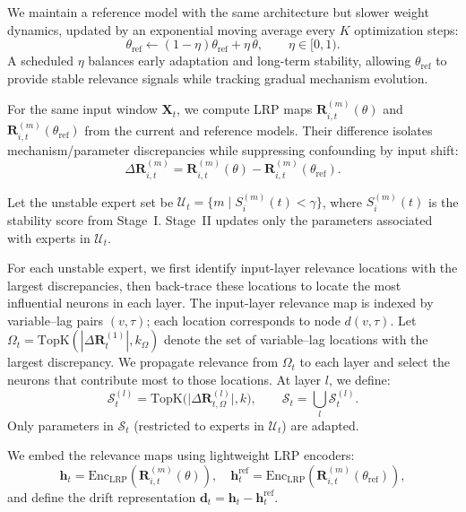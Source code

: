 ﻿\documentclass[journal]{IEEEtran}
\newenvironment{auditproblemblock}{\begingroup\color{red}}{\endgroup}
\begin{document}
\begin{auditproblemblock}
We maintain a reference model with the same architecture but slower weight dynamics, updated by an exponential moving average every $K$ optimization steps:
\begin{equation}
\theta_{\mathrm{ref}} \leftarrow (1-\eta)\theta_{\mathrm{ref}} + \eta\,\theta,\qquad \eta\in[0,1).
\end{equation}
A scheduled $\eta$ balances early adaptation and long-term stability, allowing $\theta_{\mathrm{ref}}$ to provide stable relevance signals while tracking gradual mechanism evolution.

For the same input window $\mathbf{X}_t$, we compute LRP maps $\mathbf{R}_{i,t}^{(m)}(\theta)$ and $\mathbf{R}_{i,t}^{(m)}(\theta_{\mathrm{ref}})$ from the current and reference models. Their difference isolates mechanism/parameter discrepancies while suppressing confounding by input shift:
\begin{equation}
\Delta \mathbf{R}_{i,t}^{(m)} = \mathbf{R}_{i,t}^{(m)}(\theta)-\mathbf{R}_{i,t}^{(m)}(\theta_{\mathrm{ref}}).
\end{equation}

Let the unstable expert set be $\mathcal{U}_t=\{m \mid S_i^{(m)}(t) < \gamma\}$, where $S_i^{(m)}(t)$ is the stability score from Stage~I. Stage~II updates only the parameters associated with experts in $\mathcal{U}_t$.

For each unstable expert, we first identify input-layer relevance locations with the largest discrepancies, then back-trace these locations to locate the most influential neurons in each layer. The input-layer relevance map is indexed by variable--lag pairs $(v,\tau)$; each location corresponds to node $d(v,\tau)$. Let $\Omega_t=\mathrm{TopK}(|\Delta \mathbf{R}^{(1)}_t|,k_{\Omega})$ denote the set of variable--lag locations with the largest discrepancy. We propagate relevance from $\Omega_t$ to each layer and select the neurons that contribute most to those locations. At layer $l$, we define:
\begin{equation}
\mathcal{S}_t^{(l)}=\mathrm{TopK}\Big(\big|\Delta \mathbf{R}^{(l)}_{t,\Omega}\big|,k\Big),\qquad
\mathcal{S}_t=\bigcup_l \mathcal{S}_t^{(l)}.
\end{equation}
Only parameters in $\mathcal{S}_t$ (restricted to experts in $\mathcal{U}_t$) are adapted.

We embed the relevance maps using lightweight LRP encoders:
\begin{equation}
\mathbf{h}_{t}=\mathrm{Enc}_{\mathrm{LRP}}\!\left(\mathbf{R}_{i,t}^{(m)}(\theta)\right),\quad
\mathbf{h}^{\mathrm{ref}}_{t}=\mathrm{Enc}_{\mathrm{LRP}}\!\left(\mathbf{R}_{i,t}^{(m)}(\theta_{\mathrm{ref}})\right),
\end{equation}
and define the drift representation $\mathbf{d}_t=\mathbf{h}_{t}-\mathbf{h}^{\mathrm{ref}}_{t}$.


\end{auditproblemblock}
\end{document}
